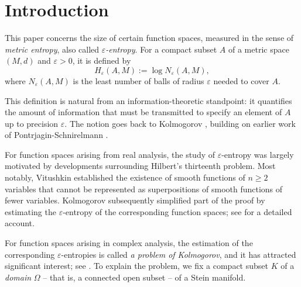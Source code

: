 \documentclass[12pt]{article}
\numberwithin{equation}{section}
\theoremstyle{theorem}
\theoremstyle{definition}
\theoremstyle{remark}
\begin{document}
\vspace*{-0.2cm}

\noindent \hrulefill



\section{Introduction}\label{sect_intro}
	This paper concerns the size of certain function spaces, measured in the sense of \textit{metric entropy}, also called \textit{$\varepsilon$-entropy}. 
	For a compact subset $A$ of a metric space $(M, d)$ and $\varepsilon > 0$, it is defined by
	\begin{equation}
		H_{\varepsilon}(A, M)
		:=
		\log N_{\varepsilon}(A, M),
	\end{equation}
	where $N_{\varepsilon}(A, M)$ is the least number of balls of radius $\varepsilon$ needed to cover $A$.
	\par 
	This definition is natural from an information-theoretic standpoint: it quantifies the amount of information that must be transmitted to specify an element of $A$ up to precision $\varepsilon$.
	The notion goes back to Kolmogorov \cite{KolmEntr, KolmTikh}, building on earlier work of Pontrjagin-Schnirelmann \cite{PontrSchnir}.
	\par 
	For function spaces arising from real analysis, the study of $\varepsilon$-entropy was largely motivated by developments surrounding Hilbert's thirteenth problem. 
	Most notably, Vitushkin \cite{VitushkinThese} established the existence of smooth functions of $n \geq 2$ variables that cannot be represented as superpositions of smooth functions of fewer variables. 
	Kolmogorov \cite{KolmogorovVitush} subsequently simplified part of the proof by estimating the $\varepsilon$-entropy of the corresponding function spaces; see \cite{VitushkinBook, VitushkinHalfCent} for a detailed account.
	\par 
	For function spaces arising in complex analysis, the estimation of the corresponding $\varepsilon$-entropies is called \textit{a problem of Kolmogorov}, and it has attracted significant interest; see \cite{KolmEntr, Babenko, Erokhin, LevinTikh, ZahariutaBases, Nguyen, WidomL2Kolm, Widom, ZakharyutaSkiba, NivocheConj, BandNivoc}.
	To explain the problem, we fix a compact subset $K$ of a \textit{domain} $\Omega$ -- that is, a connected open subset -- of a Stein manifold.
\end{document}
